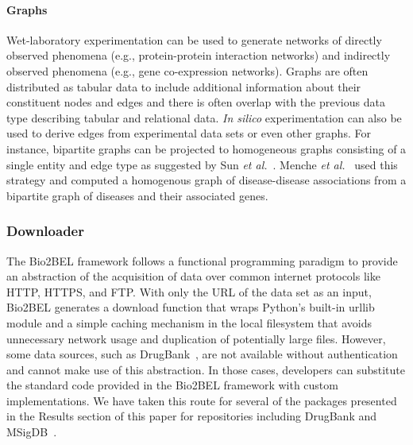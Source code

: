\paragraph*{Graphs}
Wet-laboratory experimentation can be used to generate networks of directly observed phenomena (e.g., protein-protein interaction networks) and indirectly observed phenomena (e.g., gene co-expression networks).
Graphs are often distributed as tabular data to include additional information about their constituent nodes and edges and there is often overlap with the previous data type describing tabular and relational data.
\textit{In silico} experimentation can also be used to derive edges from experimental data sets or even other graphs.
For instance, bipartite graphs can be projected to homogeneous graphs consisting of a single entity and edge type as suggested by Sun \textit{et al.}~\cite{Sun2014}.
Menche \textit{et al.}~\cite{Menche2015} used this strategy and computed a homogenous graph of disease-disease associations from a bipartite graph of diseases and their associated genes.

\subsubsection*{Downloader}
The Bio2BEL framework follows a functional programming paradigm to provide an abstraction of the acquisition of data over common internet protocols like HTTP, HTTPS, and FTP\@.
With only the URL of the data set as an input, Bio2BEL generates a download function that wraps Python's built-in urllib module and a simple caching mechanism in the local filesystem that avoids unnecessary network usage and duplication of potentially large files.
However, some data sources, such as DrugBank~\cite{Wishart2018}, are not available without authentication and cannot make use of this abstraction. In those cases, developers can substitute the standard code provided in the Bio2BEL framework with custom implementations.
We have taken this route for several of the packages presented in the Results section of this paper for repositories including DrugBank and MSigDB~\cite{Liberzon2015}.


